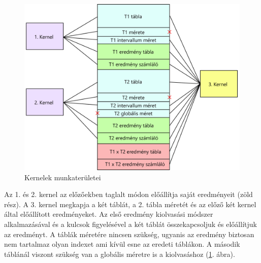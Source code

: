 \begin{figure}[h!]
\centering
\includegraphics[width=12cm]{images/join_kernels.png}
\caption{Kernelek munkaterületei }
\label{fig:join_kernels}
\end{figure}

Az 1. és 2. kernel az előzőekben taglalt módon előállítja saját eredményeit (zöld rész). 
A 3. kernel megkapja a két táblát, a 2. tábla méretét és az előző két kernel által előállított eredményeket.
Az első eredmény kiolvasási módszer alkalmazásával és a kulcsok figyelésével a két táblát összekapcsoljuk és előállítjuk az eredményt.
A táblák méretére nincsen szükség, ugyanis az eredmény biztosan nem tartalmaz olyan indexet ami kívül esne az eredeti táblákon. A második táblánál viszont szükség van a globális méretre is a kiolvasáshoz (\ref{fig:join_kernels}. ábra).
